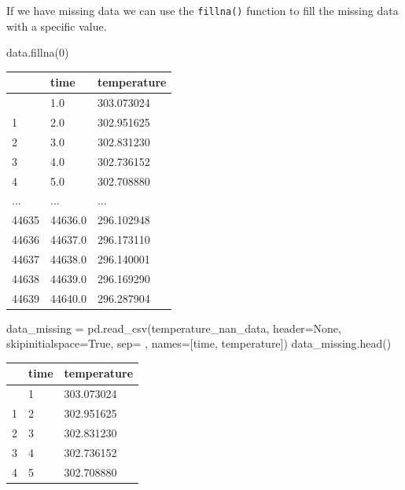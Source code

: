 \documentclass[
  letterpaper,
  DIV=11,
  numbers=noendperiod]{scrreprt}
\newenvironment{Shaded}{\begin{snugshade}}{\end{snugshade}}
\newcommand{\DecValTok}[1]{\textcolor[rgb]{0.68,0.00,0.00}{#1}}
\newcommand{\NormalTok}[1]{\textcolor[rgb]{0.00,0.23,0.31}{#1}}
\newcommand{\OperatorTok}[1]{\textcolor[rgb]{0.37,0.37,0.37}{#1}}
\newcommand{\StringTok}[1]{\textcolor[rgb]{0.13,0.47,0.30}{#1}}
\newcommand{\VariableTok}[1]{\textcolor[rgb]{0.07,0.07,0.07}{#1}}
\begin{document}
If we have missing data we can use the \texttt{fillna()} function to
fill the missing data with a specific value.

\begin{Shaded}
\begin{Highlighting}[]
\NormalTok{data.fillna(}\DecValTok{0}\NormalTok{)}
\end{Highlighting}
\end{Shaded}

\begin{longtable}[]{@{}lll@{}}
\toprule\noalign{}
& time & temperature \\
\midrule\noalign{}
\endhead
\bottomrule\noalign{}
\endlastfoot
0 & 1.0 & 303.073024 \\
1 & 2.0 & 302.951625 \\
2 & 3.0 & 302.831230 \\
3 & 4.0 & 302.736152 \\
4 & 5.0 & 302.708880 \\
... & ... & ... \\
44635 & 44636.0 & 296.102948 \\
44636 & 44637.0 & 296.173110 \\
44637 & 44638.0 & 296.140001 \\
44638 & 44639.0 & 296.169290 \\
44639 & 44640.0 & 296.287904 \\
\end{longtable}

\begin{Shaded}
\begin{Highlighting}[]
\NormalTok{data\_missing }\OperatorTok{=}\NormalTok{ pd.read\_csv(temperature\_nan\_data, header}\OperatorTok{=}\VariableTok{None}\NormalTok{, skipinitialspace}\OperatorTok{=}\VariableTok{True}\NormalTok{, sep}\OperatorTok{=}\StringTok{\textquotesingle{} \textquotesingle{}}\NormalTok{, names}\OperatorTok{=}\NormalTok{[}\StringTok{\textquotesingle{}time\textquotesingle{}}\NormalTok{, }\StringTok{\textquotesingle{}temperature\textquotesingle{}}\NormalTok{])}
\NormalTok{data\_missing.head()}
\end{Highlighting}
\end{Shaded}

\begin{longtable}[]{@{}lll@{}}
\toprule\noalign{}
& time & temperature \\
\midrule\noalign{}
\endhead
\bottomrule\noalign{}
\endlastfoot
0 & 1 & 303.073024 \\
1 & 2 & 302.951625 \\
2 & 3 & 302.831230 \\
3 & 4 & 302.736152 \\
4 & 5 & 302.708880 \\
\end{longtable}
\end{document}
